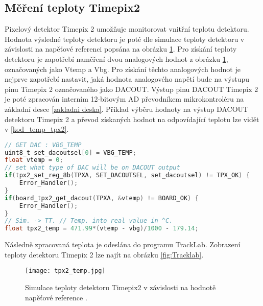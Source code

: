 \subsection{Měření teploty Timepix2}
Pixelový detektor Timepix 2 umožňuje monitorovat vnitřní teplotu detektoru. Hodnota výsledné teploty detektoru je poté dle simulace teploty detektoru v závislosti na napěťové referenci popsána na obrázku \ref{fig:tpx2_temp}. Pro získání teploty detektoru je zapotřebí naměření dvou analogových hodnot z obrázku \ref{fig:tpx2_temp}, označovaných jako Vtemp a Vbg. Pro získání těchto analogových hodnot je nejprve zapotřebí nastavit, jaká hodnota analogového napětí bude na výstupu pinu Timepix 2 označovaného jako DACOUT. Výstup pinu DACOUT Timepix 2 je poté zpracován interním 12-bitovým AD převodníkem mikrokontroléru na základní desce \ref{zakladni deska}. Příklad výběru hodnoty na výstup DACOUT detektoru Timepix 2 a převod získaných hodnot na odpovídající teplotu lze vidět v \ref{kod_temp_tpx2}.
\begin{lstlisting}[frame=single, language=C, caption={Výběr výstupu DACOUT detektoru Timepix2 a odečtení hodnoty detektoru.}, label=kod_temp_tpx2]
// GET DAC : VBG_TEMP
uint8_t set_dacoutsel[0] = VBG_TEMP; 
float vtemp = 0;
// set what type of DAC will be on DACOUT output								   
if(tpx2_set_reg_8b(TPXA, SET_DACOUTSEL, set_dacoutsel) != TPX_OK) {    
	Error_Handler();
}
if(board_tpx2_get_dacout(TPXA, &vtemp) != BOARD_OK) {
	Error_Handler();
}
// Sim. -> TT. // Temp. into real value in ^C.
float tpx2_temp = 471.99*(vtemp - vbg)/1000 - 179.14;					
\end{lstlisting}
Následně zpracovaná teplota je odeslána do programu TrackLab. Zobrazení teploty detektoru Timepix 2 lze najít na obrázku \ref{fig:Tracklab}.  
\begin{figure}[h!]
	\centering
	\captionsetup{justification=centering}
	\texttt{[image: tpx2\_temp.jpg]}
	\caption{Simulace teploty detektoru Timepix2 v závislosti na hodnotě napěťové reference \cite{tpx2_manual}.} 
	\label{fig:tpx2_temp}
\end{figure}

